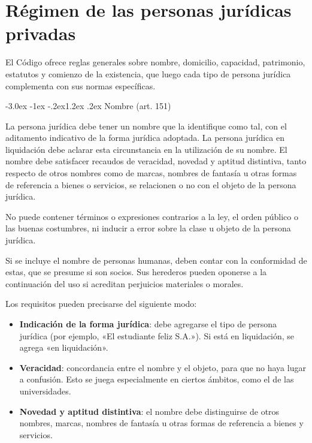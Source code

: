 \documentclass[12pt,oneside]{book}
\makeatletter
\renewcommand\section{\@startsection{section}{1}{\z@}%
  {-3.0ex \@plus -1ex \@minus -.2ex}{1.2ex \@plus .2ex}%
  {\normalfont\large\bfseries\color{acento}}}
\makeatother
\begin{document}
\chapter{Régimen de las personas jurídicas privadas}

El Código ofrece reglas generales sobre nombre, domicilio, capacidad, patrimonio, estatutos y comienzo de la existencia, que luego cada tipo de persona jurídica complementa con sus normas específicas.

\section{Nombre (art. 151)}

\begin{definicion}
La persona jurídica debe tener un nombre que la identifique como tal, con el aditamento indicativo de la forma jurídica adoptada. La persona jurídica en liquidación debe aclarar esta circunstancia en la utilización de su nombre. El nombre debe satisfacer recaudos de veracidad, novedad y aptitud distintiva, tanto respecto de otros nombres como de marcas, nombres de fantasía u otras formas de referencia a bienes o servicios, se relacionen o no con el objeto de la persona jurídica.

No puede contener términos o expresiones contrarios a la ley, el orden público o las buenas costumbres, ni inducir a error sobre la clase u objeto de la persona jurídica.

Si se incluye el nombre de personas humanas, deben contar con la conformidad de estas, que se presume si son socios. Sus herederos pueden oponerse a la continuación del uso si acreditan perjuicios materiales o morales.
\end{definicion}

Los requisitos pueden precisarse del siguiente modo:

\begin{itemize}
    \item \textbf{Indicación de la forma jurídica}: debe agregarse el tipo de persona jurídica (por ejemplo, «El estudiante feliz S.A.»). Si está en liquidación, se agrega «en liquidación».
    \item \textbf{Veracidad}: concordancia entre el nombre y el objeto, para que no haya lugar a confusión. Esto se juega especialmente en ciertos ámbitos, como el de las universidades.
    \item \textbf{Novedad y aptitud distintiva}: el nombre debe distinguirse de otros nombres, marcas, nombres de fantasía u otras formas de referencia a bienes y servicios.
\end{itemize}
\end{document}
